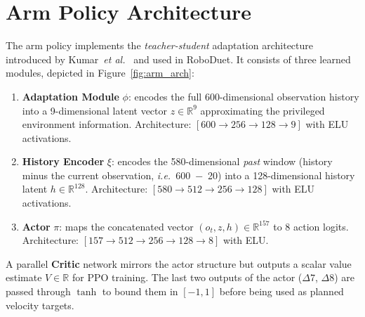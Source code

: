 \section{Arm Policy Architecture}
\label{sec:arm_policy}

The arm policy implements the \emph{teacher-student} adaptation architecture
introduced by Kumar~\emph{et al.}~\cite{kumar2021rma} and used in RoboDuet.
It consists of three learned modules, depicted in Figure~\ref{fig:arm_arch}:

\begin{enumerate}
  \item \textbf{Adaptation Module} $\phi$:
        encodes the full 600-dimensional observation history into a
        9-dimensional latent vector $z \in \mathbb{R}^9$ approximating
        the privileged environment information.
        Architecture: $[600 \to 256 \to 128 \to 9]$ with ELU activations.
  \item \textbf{History Encoder} $\xi$:
        encodes the 580-dimensional \emph{past} window
        (history minus the current observation, \emph{i.e.}\ 600~$-$~20) into
        a 128-dimensional history latent $h \in \mathbb{R}^{128}$.
        Architecture: $[580 \to 512 \to 256 \to 128]$ with ELU activations.
  \item \textbf{Actor} $\pi$:
        maps the concatenated vector $(o_t, z, h) \in \mathbb{R}^{157}$
        to 8 action logits.
        Architecture: $[157 \to 512 \to 256 \to 128 \to 8]$ with ELU.
\end{enumerate}

A parallel \textbf{Critic} network mirrors the actor structure but outputs
a scalar value estimate $V \in \mathbb{R}$ for PPO training.
The last two outputs of the actor ($\Delta 7$, $\Delta 8$) are passed through
$\tanh$ to bound them in $[-1, 1]$ before being used as planned velocity
targets.

